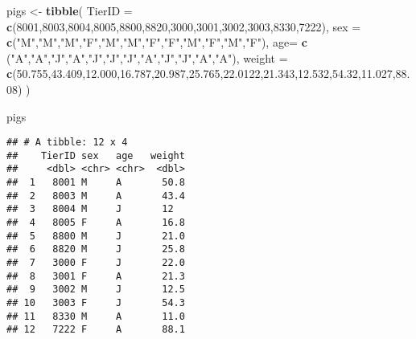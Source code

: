\documentclass[
]{article}
\newenvironment{Shaded}{\begin{snugshade}}{\end{snugshade}}
\newcommand{\DataTypeTok}[1]{\textcolor[rgb]{0.13,0.29,0.53}{#1}}
\newcommand{\DecValTok}[1]{\textcolor[rgb]{0.00,0.00,0.81}{#1}}
\newcommand{\FloatTok}[1]{\textcolor[rgb]{0.00,0.00,0.81}{#1}}
\newcommand{\KeywordTok}[1]{\textcolor[rgb]{0.13,0.29,0.53}{\textbf{#1}}}
\newcommand{\NormalTok}[1]{#1}
\newcommand{\StringTok}[1]{\textcolor[rgb]{0.31,0.60,0.02}{#1}}
\begin{document}
\begin{Shaded}
\begin{Highlighting}[]
\NormalTok{pigs <-}\StringTok{ }\KeywordTok{tibble}\NormalTok{(}
  \DataTypeTok{TierID =} \KeywordTok{c}\NormalTok{(}\DecValTok{8001}\NormalTok{,}\DecValTok{8003}\NormalTok{,}\DecValTok{8004}\NormalTok{,}\DecValTok{8005}\NormalTok{,}\DecValTok{8800}\NormalTok{,}\DecValTok{8820}\NormalTok{,}\DecValTok{3000}\NormalTok{,}\DecValTok{3001}\NormalTok{,}\DecValTok{3002}\NormalTok{,}\DecValTok{3003}\NormalTok{,}\DecValTok{8330}\NormalTok{,}\DecValTok{7222}\NormalTok{),}
  \DataTypeTok{sex =} \KeywordTok{c}\NormalTok{(}\StringTok{"M"}\NormalTok{,}\StringTok{"M"}\NormalTok{,}\StringTok{"M"}\NormalTok{,}\StringTok{"F"}\NormalTok{,}\StringTok{"M"}\NormalTok{,}\StringTok{"M"}\NormalTok{,}\StringTok{"F"}\NormalTok{,}\StringTok{"F"}\NormalTok{,}\StringTok{"M"}\NormalTok{,}\StringTok{"F"}\NormalTok{,}\StringTok{"M"}\NormalTok{,}\StringTok{"F"}\NormalTok{),}
  \DataTypeTok{age=} \KeywordTok{c}\NormalTok{ (}\StringTok{"A"}\NormalTok{,}\StringTok{"A"}\NormalTok{,}\StringTok{"J"}\NormalTok{,}\StringTok{"A"}\NormalTok{,}\StringTok{"J"}\NormalTok{,}\StringTok{"J"}\NormalTok{,}\StringTok{"J"}\NormalTok{,}\StringTok{"A"}\NormalTok{,}\StringTok{"J"}\NormalTok{,}\StringTok{"J"}\NormalTok{,}\StringTok{"A"}\NormalTok{,}\StringTok{"A"}\NormalTok{),}
  \DataTypeTok{weight =} \KeywordTok{c}\NormalTok{(}\FloatTok{50.755}\NormalTok{,}\FloatTok{43.409}\NormalTok{,}\FloatTok{12.000}\NormalTok{,}\FloatTok{16.787}\NormalTok{,}\FloatTok{20.987}\NormalTok{,}\FloatTok{25.765}\NormalTok{,}\FloatTok{22.0122}\NormalTok{,}\FloatTok{21.343}\NormalTok{,}\FloatTok{12.532}\NormalTok{,}\FloatTok{54.32}\NormalTok{,}\FloatTok{11.027}\NormalTok{,}\FloatTok{88.08}\NormalTok{)}
\NormalTok{)}

\NormalTok{pigs}
\end{Highlighting}
\end{Shaded}

\begin{verbatim}
## # A tibble: 12 x 4
##    TierID sex   age   weight
##     <dbl> <chr> <chr>  <dbl>
##  1   8001 M     A       50.8
##  2   8003 M     A       43.4
##  3   8004 M     J       12  
##  4   8005 F     A       16.8
##  5   8800 M     J       21.0
##  6   8820 M     J       25.8
##  7   3000 F     J       22.0
##  8   3001 F     A       21.3
##  9   3002 M     J       12.5
## 10   3003 F     J       54.3
## 11   8330 M     A       11.0
## 12   7222 F     A       88.1
\end{verbatim}
\end{document}
